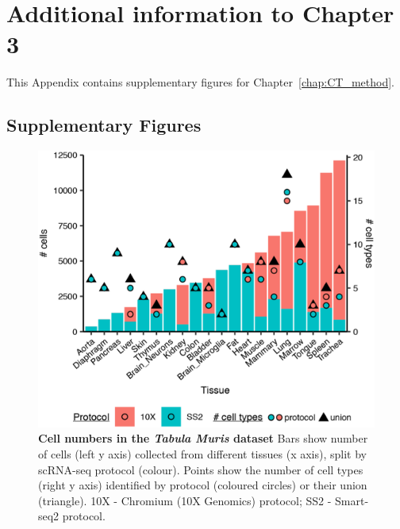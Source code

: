 
\chapter{Additional information to Chapter 3} \label{appendix:CTtrain}
This Appendix contains supplementary figures for Chapter~\ref{chap:CT_method}.


\section{Supplementary Figures}
\label{sectionB1.1}

\begin{figure}[ht!]
    \centering    
    \includegraphics[scale=1.1]{Appendix2/Figs/countsCTCells_TabulaMuris.png} %
    \caption[Cell numbers in the \textit{Tabula Muris} dataset]{\textbf{Cell numbers in the \textit{Tabula Muris} dataset} \newline Bars show number of cells (left y axis) collected from different tissues (x axis), split by scRNA-seq protocol (colour). Points show the number of cell types (right y axis) identified by protocol (coloured circles) or their union (triangle). 10X - Chromium (10X Genomics) protocol; SS2 - Smart-seq2 protocol.}
    \label{fig:appB_tmcounts}
\end{figure}


